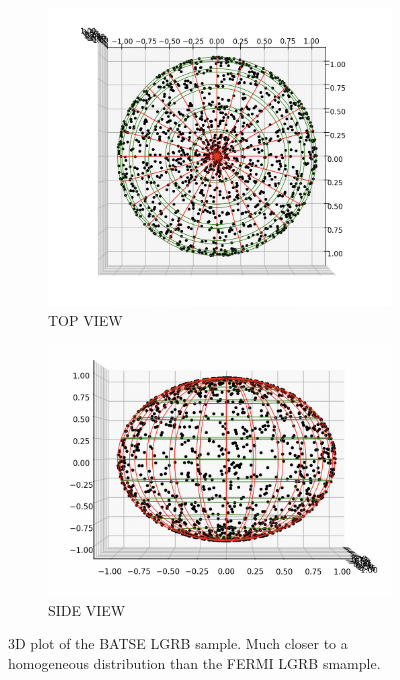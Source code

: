 \documentclass[12pt]{article}
\begin{document}
\begin{figure}[h]
  \begin{subfigure}{.5\textwidth}
  \centering
    \includegraphics[width=1\linewidth]{BATSE LGRB 3D.png}
    \caption{TOP VIEW}
  \end{subfigure}%
  \begin{subfigure}{.5\textwidth}
  \centering
    \includegraphics[width=1\linewidth]{BATSE LGRB 3DD.png}
    \caption{SIDE VIEW}
  \end{subfigure}
  \caption{3D plot of the BATSE LGRB sample. Much closer to a homogeneous distribution than the FERMI LGRB smample.}
\end{figure}
\end{document}
